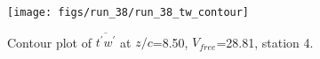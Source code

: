 \begin{figure}[H]
\centering
\texttt{[image: figs/run\_38/run\_38\_tw\_contour]}
\caption{Contour plot of $\overline{t^\prime w^\prime}$ at $z/c$=8.50, $V_{free}$=28.81, station 4.}
\label{fig:run_38_tw_contour}
\end{figure}


